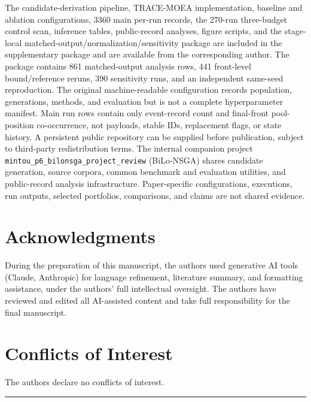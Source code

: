 \documentclass[energies,article,submit,moreauthors]{Definitions/mdpi}
\begin{document}
The candidate-derivation pipeline, TRACE-MOEA implementation, baseline and ablation configurations, 3360 main per-run records, the 270-run three-budget control scan, inference tables, public-record analyses, figure scripts, and the stage-local matched-output/normalization/sensitivity package are included in the supplementary package and are available from the corresponding author. The package contains 861 matched-output analysis rows, 441 front-level bound/reference reruns, 390 sensitivity runs, and an independent same-seed reproduction. The original machine-readable configuration records population, generations, methods, and evaluation but is not a complete hyperparameter manifest. Main run rows contain only event-record count and final-front pool-position co-occurrence, not payloads, stable IDs, replacement flags, or state history. A persistent public repository can be supplied before publication, subject to third-party redistribution terms. The internal companion project \texttt{mintou\_p6\_bilonsga\_project\_review} (BiLo-NSGA) shares candidate generation, source corpora, common benchmark and evaluation utilities, and public-record analysis infrastructure. Paper-specific configurations, executions, run outputs, selected portfolios, comparisons, and claims are not shared evidence.

\section*{Acknowledgments}

During the preparation of this manuscript, the authors used generative AI tools (Claude, Anthropic) for language refinement, literature summary, and formatting assistance, under the authors' full intellectual oversight. The authors have reviewed and edited all AI-assisted content and take full responsibility for the final manuscript.

\section*{Conflicts of Interest}

The authors declare no conflicts of interest.

\begin{center}\rule{0.5\linewidth}{0.5pt}\end{center}
\end{document}
